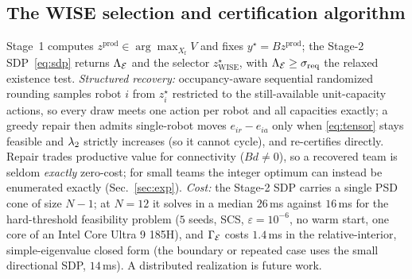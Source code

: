 \subsection{The WISE selection and certification algorithm}
\label{sec:algorithm}

Stage~1 computes $z^{\mathrm{prod}}\in\arg\max_{X_{\mathrm f}}V$ and fixes
$y^{\star}=Bz^{\mathrm{prod}}$; the Stage-2 SDP~\eqref{eq:sdp} returns $\Lambda_{\mathcal{E}}$ and the selector
$z^{\star}_{\mathrm{WISE}}$, with $\Lambda_{\mathcal{E}}\ge\sigma_{\mathrm{req}}$ the relaxed existence test.
\emph{Structured recovery:} occupancy-aware sequential randomized rounding samples robot $i$
from $z^{\star}_i$ restricted to the still-available unit-capacity actions, so every draw meets
one action per robot and all capacities exactly; a greedy repair then admits single-robot moves
$e_{ir}{-}e_{ia}$ only when \eqref{eq:tensor} stays feasible and $\lambda_2$ strictly increases
(so it cannot cycle), and re-certifies directly. Repair trades productive
value for connectivity ($Bd\neq0$), so a recovered team is seldom \emph{exactly} zero-cost; for
small teams the integer optimum can instead be enumerated exactly (Sec.~\ref{sec:exp}).
\emph{Cost:} the Stage-2 SDP carries a single PSD cone of size $N{-}1$; at $N{=}12$ it solves in
a median $26$\,ms against $16$\,ms for the hard-threshold feasibility problem ($5$ seeds, SCS,
$\varepsilon=10^{-6}$, no warm start, one core of an Intel Core Ultra 9 185H), and
$\Gamma_{\mathcal{E}}$ costs $1.4$\,ms in the relative-interior, simple-eigenvalue closed
form (the boundary or repeated case uses the small directional SDP, $14$\,ms).
A distributed realization is future work.
